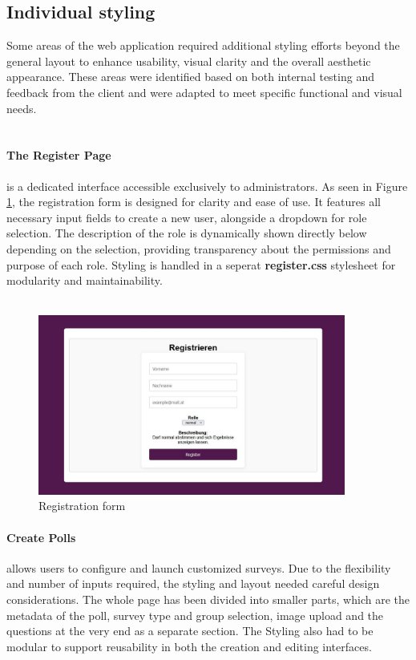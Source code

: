 \documentclass[a4paper,12pt]{report}
\begin{document}
\subsection{Individual styling}
Some areas of the web application required additional styling efforts beyond the general layout to enhance usability, visual clarity and the overall aesthetic appearance. These areas were identified based on both internal testing and feedback from the client and were adapted to meet specific functional and visual needs.\\\\
\paragraph{The Register Page} is a dedicated interface accessible exclusively to administrators. As seen in Figure \ref{fig:register_view}, the registration form is designed for clarity and ease of use. It features all necessary input fields to create a new user, alongside a dropdown for role selection. The description of the role is dynamically shown directly below depending on the selection, providing transparency about the permissions and purpose of each role. Styling is handled in a seperat \textbf{register.css} stylesheet for modularity and maintainability.\\\\ 
\begin{figure}[H]
\centering
\includegraphics[width=0.9\textwidth]{pics/register_view.jpg}
\caption{Registration form}
\label{fig:register_view}
\end{figure}
\paragraph{Create Polls} allows users to configure and launch customized surveys. Due to the flexibility and number of inputs required, the styling and layout needed careful design considerations. The whole page has been divided into smaller parts, which are the metadata of the poll, survey type and group selection, image upload and the questions at the very end as a separate section. The Styling also had to be modular to support reusability in both the creation and editing interfaces.\\\\
\end{document}
